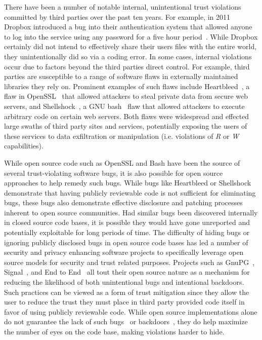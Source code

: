 There have been a number of notable internal, unintentional trust
violations committed by third parties over the past ten years. For
example, in 2011 Dropbox introduced a bug into their authentication
system that allowed anyone to log into the service using any password
for a five hour period~\cite{dropbox-authbug}. While Dropbox certainly
did not intend to effectively share their users files with the entire
world, they unintentionally did so via a coding error. In some cases,
internal violations occur due to factors beyond the third parties
direct control. For example, third parties are susceptible to a range
of software flaws in externally maintained libraries they rely
on. Prominent examples of such flaws include
Heartbleed~\cite{heartbleed}, a flaw in OpenSSL~\cite{openssl} that
allowed attackers to steal private data from secure web servers, and
Shellshock~\cite{symantec-shellshock}, a GNU bash~\cite{gnu-bash} flaw
that allowed attackers to execute arbitrary code on certain web
servers. Both flaws were widespread and effected large swaths of third
party sites and services, potentially exposing the users of these
services to data exfiltration or manipulation (i.e. violations of
\emph{R} or \emph{W} capabilities).

While open source code such as OpenSSL and Bash have been the source
of several trust-violating software bugs, it is also possible for open
source approaches to help remedy such bugs. While bugs like Heartbleed
or Shellshock demonstrate that having publicly reviewable code is not
sufficient for eliminating bugs, these bugs also demonstrate effective
disclosure and patching processes inherent to open source
communities. Had similar bugs been discovered internally in closed
source code bases, it is possible they would have gone unreported and
potentially exploitable for long periods of time. The difficulty of
hiding bugs or ignoring publicly disclosed bugs in open source code
bases has led a number of security and privacy enhancing software
projects to specifically leverage open source models for security and
trust related purposes. Projects such as GnuPG~\cite{gnupg},
Signal~\cite{openwhisper}, and End to End~\cite{google-endtoend,
  yahoo-endtoend} all tout their open source nature as a mechanism for
reducing the likelihood of both unintentional bugs and intentional
backdoors. Such practices can be viewed as a form of trust mitigation
since they allow the user to reduce the trust they must place in third
party provided code itself in favor of using publicly reviewable
code. While open source implementations alone do not guarantee the
lack of such bugs~\cite{frosch2014} or backdoors~\cite{thompson1984},
they do help maximize the number of eyes on the code base, making
violations harder to hide.

